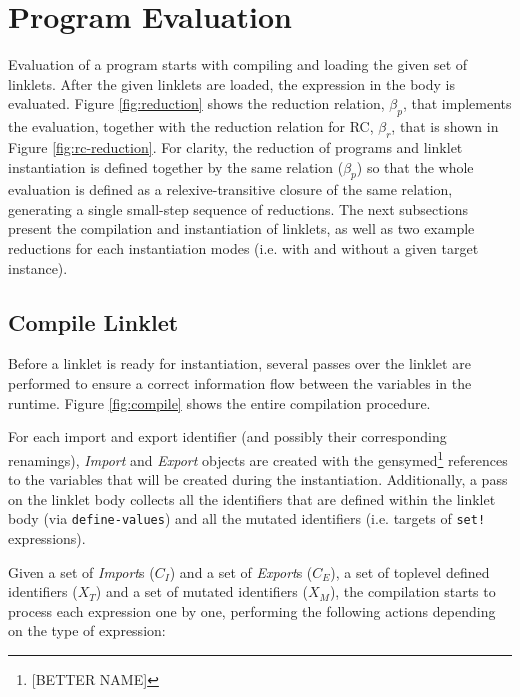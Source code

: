 \documentclass[sigplan,screen,anonymous]{acmart}
\def\dash {\text{-}}
\begin{document}
\section{Program Evaluation}

Evaluation of a program starts with compiling and loading the given
set of linklets. After the given linklets are loaded, the expression
in the body is evaluated. Figure \ref{fig:reduction} shows the
reduction relation, $\beta_p$, that implements the evaluation, together
with the reduction relation for RC, $\beta_r$, that is shown in Figure
\ref{fig:rc-reduction}. For clarity, the reduction of programs and
linklet instantiation is defined together by the same relation ($\beta_p$)
so that the whole evaluation is defined as a relexive-transitive
closure of the same relation, generating a single small-step sequence
of reductions. The next subsections present the compilation and
instantiation of linklets, as well as two example reductions for each
instantiation modes (i.e. with and without a given target instance).

\subsection{Compile Linklet}
\label{sec:compile-linklet}

Before a linklet is ready for instantiation, several passes over the
linklet are performed to ensure a correct information flow between the
variables in the run\dash time. Figure \ref{fig:compile} shows the
entire compilation procedure.

For each import and export identifier (and possibly their
corresponding renamings), \textit{Import} and \textit{Export} objects
are created with the gensymed\footnote{[BETTER NAME]} references to
the variables that will be created during the
instantiation. Additionally, a pass on the linklet body collects all
the identifiers that are defined within the linklet body (via
\verb|define-values|) and all the mutated identifiers (i.e. targets of
\verb|set!| expressions).

Given a set of \textit{Import}s ($\mathit{C_I}$) and a set of
\textit{Export}s ($\mathit{C_E}$), a set of toplevel defined
identifiers ($\mathit{X_T}$) and a set of mutated identifiers
($\mathit{X_M}$), the compilation starts to process each expression
one by one, performing the following actions depending on the type of
expression:
\end{document}
